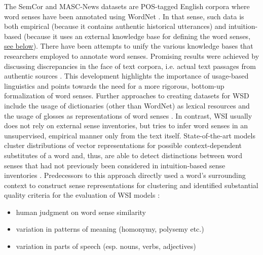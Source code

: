 \documentclass[runningheads]{llncs}
\begin{document}
The SemCor \parencite{mihalceaSemCorCorpus2008} and MASC-News \parencite[4218]{moroAnnotatingMASCCorpus2014} datasets are \gls{POS}-tagged English corpora where word senses have been annotated using WordNet \parencite{tengiDesignImplementationWordNet1998}. In that sense, such data is both empirical (because it contains authentic historical utterances) and intuition-based (because it uses an external knowledge base for defining the word senses, \hyperref[WordNet]{see below}). There have been attempts to unify \parencite[216]{navigliBabelNetBuildingVery2010} the various knowledge bases that researchers employed to annotate word senses. Promising results were achieved by discussing discrepancies in the face of text corpora, i.e. actual text passages from authentic sources \parencite[127]{bakerWordNetFrameNetComplementary2009}. This development highlights the importance of usage-based linguistics and points towards the need for a more rigorous, bottom-up formalization of word senses. Further approaches to creating datasets for \gls{WSD} include the usage of dictionaries (other than WordNet) as lexical resources \parencites[25]{mihalceaSenseval3EnglishLexical2004}[2]{jimeno-yepesExploitingMeSHIndexing2011}[6]{yuanSemisupervisedWordSense2016} and the usage of glosses as representations of word senses \parencite[8]{luoIncorporatingGlossesNeural2018}. In contrast, \gls{WSI} usually does not rely on external sense inventories, but tries to infer word senses in an unsupervised, empirical manner only from the text itself. State-of-the-art models cluster distributions of vector representations for possible context-dependent substitutes of a word and, thus, are able to detect distinctions between word senses that had not previously been considered in intuition-based sense inventories \parencite[1-4]{amramiBetterSubstitutionbasedWord2019}. Predecessors to this approach directly used a word's surrounding context to construct sense representations for clustering and identified substantial quality criteria for the evaluation of \gls{WSI} models \parencite[876-878]{huangImprovingWordRepresentations2012}:
\begin{itemize}
	\item human judgment on word sense similarity
	\item variation in patterns of meaning (homonymy, polysemy etc.)
	\item variation in parts of speech (esp. nouns, verbs, adjectives)
\end{itemize}
\end{document}
